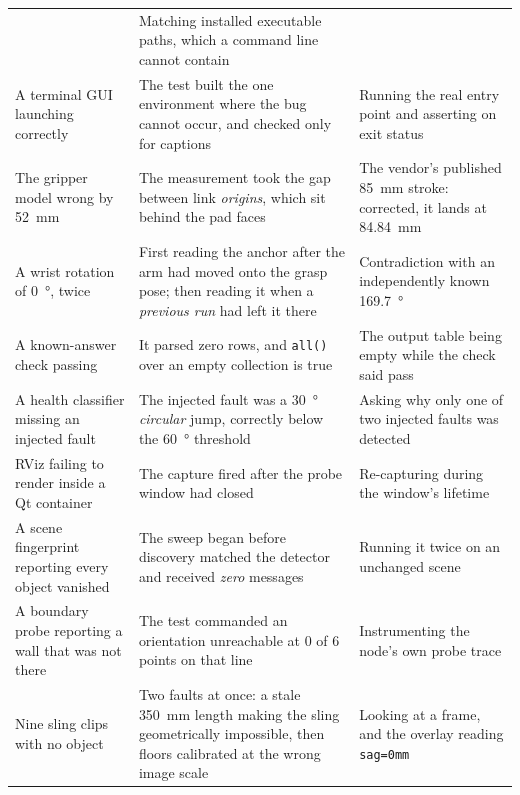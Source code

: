 \begin{table}[htbp]
\begin{tabular}{@{}p{32mm}p{45mm}p{45mm}@{}}
      & Matching installed executable paths, which a command line cannot
        contain \\
    A terminal GUI launching correctly
      & The test built the one environment where the bug cannot occur, and
        checked only for captions
      & Running the real entry point and asserting on exit status \\
    \midrule
    The gripper model wrong by \SI{52}{\milli\metre}
      & The measurement took the gap between link \emph{origins}, which sit
        behind the pad faces
      & The vendor's published \SI{85}{\milli\metre} stroke: corrected, it
        lands at \SI{84.84}{\milli\metre} \\
    A wrist rotation of \SI{0}{\degree}, twice
      & First reading the anchor after the arm had moved onto the grasp pose;
        then reading it when a \emph{previous run} had left it there
      & Contradiction with an independently known \SI{169.7}{\degree} \\
    A known-answer check passing
      & It parsed zero rows, and \texttt{all()} over an empty collection is
        true
      & The output table being empty while the check said pass \\
    A health classifier missing an injected fault
      & The injected fault was a \SI{30}{\degree} \emph{circular} jump,
        correctly below the \SI{60}{\degree} threshold
      & Asking why only one of two injected faults was detected \\
    {RViz} failing to render inside a {Qt} container
      & The capture fired after the probe window had closed
      & Re-capturing during the window's lifetime \\
    A scene fingerprint reporting every object vanished
      & The sweep began before discovery matched the detector and received
        \emph{zero} messages
      & Running it twice on an unchanged scene \\
    A boundary probe reporting a wall that was not there
      & The test commanded an orientation unreachable at 0 of 6 points on that
        line
      & Instrumenting the node's own probe trace \\
    Nine sling clips with no object
      & Two faults at once: a stale \SI{350}{\milli\metre} length making the
        sling geometrically impossible, then floors calibrated at the wrong
        image scale
      & Looking at a frame, and the overlay reading \texttt{sag=0mm} \\
    \bottomrule
  \end{tabular}
\end{table}

